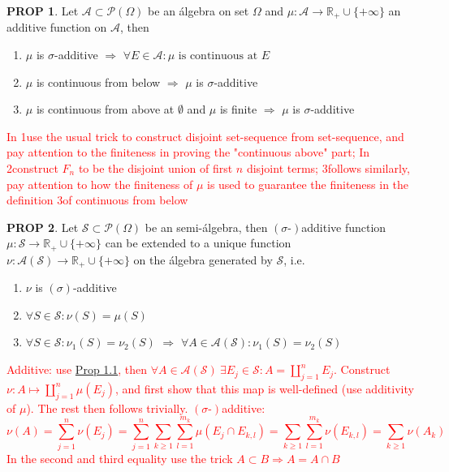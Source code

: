\documentclass[hidelinks]{article}
\theoremstyle{definition}
\theoremstyle{dotless}
\newtheorem{proposition}{PROP}[section]
\theoremstyle{remark}
\begin{document}
\begin{proposition}\label{Prop 2.2}
Let $\mathscr{A}\subset\mathscr{P}(\Omega)$ be an álgebra on set $\Omega$ and $\mu:\mathscr{A}\to\mathbb{R}_+\cup\{+\infty\}$ an additive function on $\mathscr{A}$, then \begin{enumerate}[label=\arabic*\degree]
    \item $\mu$ is $\sigma$-additive $\Rightarrow$ $\forall E\in\mathscr{A}:\mu\textrm{ is continuous at }E$
    \item $\mu$ is continuous from below $\Rightarrow$ $\mu$ is $\sigma$-additive
    \item $\mu$ is continuous from above at $\emptyset$ and $\mu$ is finite $\Rightarrow$ $\mu$ is $\sigma$-additive
\end{enumerate}
\end{proposition}
\textcolor{red}{In 1\degree  use the usual trick to construct disjoint set-sequence from set-sequence, and pay attention to the finiteness in proving the "continuous above" part; In 2\degree construct $F_n$ to be the disjoint union of first $n$ disjoint terms; 3\degree follows similarly, pay attention to how the finiteness of $\mu$ is used to guarantee the finiteness in the definition 3\degree of continuous from below}

\begin{proposition}\label{Prop 2.3}
Let $\mathscr{S}\subset\mathscr{P}(\Omega)$ be an semi-álgebra, then $(\sigma\textrm{-})$additive function $\mu: \mathscr{S}\to \mathbb{R}_+\cup\{+\infty\}$ can be extended to a unique function $\nu: \mathscr{A}(\mathscr{S})\to \mathbb{R}_+\cup\{+\infty\}$ on the álgebra generated by $\mathscr{S}$, i.e.
\begin{enumerate}[label=\arabic*\degree]
    \item $\nu$ is $(\sigma)$-additive
    \item $\forall S\in\mathscr{S}:\nu(S)=\mu(S)$
    \item $\forall S\in\mathscr{S}:\nu_1(S)=\nu_2(S)$ $\Rightarrow$ $\forall A\in\mathscr{A}(\mathscr{S}):\nu_1(S)=\nu_2(S)$
\end{enumerate}
\end{proposition}
\textcolor{red}{Additive: use \hyperref[Prop 1.1]{Prop 1.1}, then $\forall A\in\mathscr{A}(\mathscr{S})\ \exists E_j\in\mathscr{S}:A=\coprod_{j=1}^nE_j$. Construct $\nu:A\mapsto\coprod_{j=1}^n\mu(E_j)$, and first show that this map is well-defined (use additivity of $\mu$). The rest then follows trivially.\smallbreak
$(\sigma\textrm{-})$additive:
\[\nu(A)=\sum_{j=1}^n\nu(E_j)=\sum_{j=1}^n\sum_{k\geq1}\sum_{l=1}^{m_k}\mu(E_j\cap E_{k,l})=\sum_{k\geq1}\sum_{l=1}^{m_k}\nu(E_{k,l})=\sum_{k\geq1}\nu(A_k)\]
In the second and third equality use the trick $A\subset B\Rightarrow A=A\cap B$}
\end{document}
